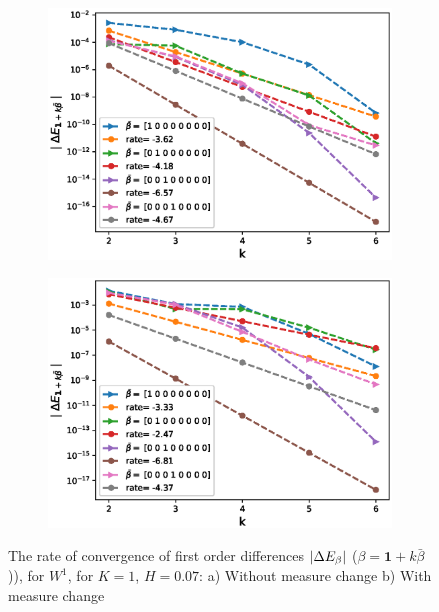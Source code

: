\documentclass[11pt]{article}
\begin{document}
\begin{figure}[h!]
	\centering
	\begin{subfigure}{.4\textwidth}
		\centering
		\includegraphics[width=1\linewidth]{./figures/rBergomi_mixed_error_rates/without_change_measure/N_4/H_007/first_difference_rbergomi_4steps_H_007_K_1_totally_hierarch_with_rate_W1}
		\caption{}
		\label{fig:sub3}
	\end{subfigure}%
	\begin{subfigure}{.4\textwidth}
		\centering
		\includegraphics[width=1\linewidth]{./figures/rBergomi_mixed_error_rates/partial_change_measure/N_4/H_007/first_difference_rbergomi_4steps_H_007_K_1_totally_hierarch_with_rate_W1_change_measure_part_spec}
		\caption{}
		\label{fig:sub4}
	\end{subfigure}
	
	\caption{The rate of convergence of  first order differences $\left\lvert\Delta E_{\beta}\right\rvert$ ($\beta=\mathbf{1}+k \bar{\beta}$)), for $W^1$, for $K=1$, $H=0.07$: a) Without measure change b) With measure change}
	\label{fig:first_diff_comp_K_1_H_007_W_1}
\end{figure}
\end{document}
